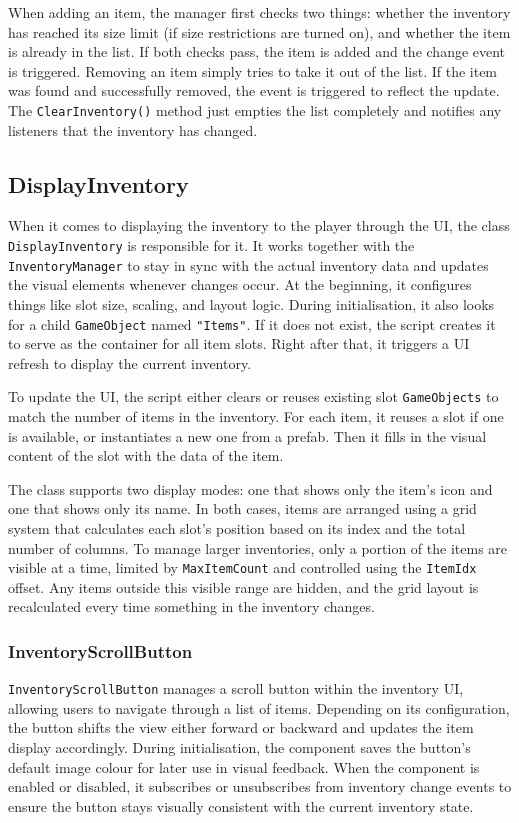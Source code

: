 When adding an item, the manager first checks two things: whether the inventory has reached its size limit (if size restrictions are turned on), and whether the item is already in the list. If both checks pass, the item is added and the change event is triggered. Removing an item simply tries to take it out of the list. If the item was found and successfully removed, the event is triggered to reflect the update. The \verb|ClearInventory()| method just empties the list completely and notifies any listeners that the inventory has changed.

\subsection{DisplayInventory}
\label{DisplayInventory}
When it comes to displaying the inventory to the player through the UI, the class \verb|DisplayInventory| is responsible for it. It works together with the \verb|InventoryManager| to stay in sync with the actual inventory data and updates the visual elements whenever changes occur. At the beginning, it configures things like slot size, scaling, and layout logic. During initialisation, it also looks for a child \verb|GameObject| named \verb|"Items"|. If it does not exist, the script creates it to serve as the container for all item slots. Right after that, it triggers a UI refresh to display the current inventory.

To update the UI, the script either clears or reuses existing slot \verb|GameObjects| to match the number of items in the inventory. For each item, it reuses a slot if one is available, or instantiates a new one from a prefab. Then it fills in the visual content of the slot with the data of the item.

The class supports two display modes: one that shows only the item's icon and one that shows only its name. In both cases, items are arranged using a grid system that calculates each slot’s position based on its index and the total number of columns. To manage larger inventories, only a portion of the items are visible at a time, limited by \verb|MaxItemCount| and controlled using the \verb|ItemIdx| offset. Any items outside this visible range are hidden, and the grid layout is recalculated every time something in the inventory changes.
 
\subsubsection{InventoryScrollButton}
\verb|InventoryScrollButton| manages a scroll button within the inventory UI, allowing users to navigate through a list of items. Depending on its configuration, the button shifts the view either forward or backward and updates the item display accordingly. During initialisation, the component saves the button's default image colour for later use in visual feedback. When the component is enabled or disabled, it subscribes or unsubscribes from inventory change events to ensure the button stays visually consistent with the current inventory state.

